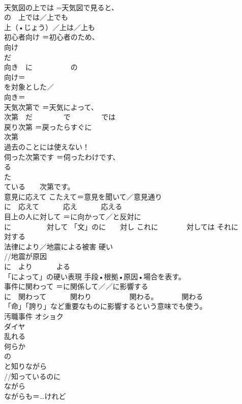 \documentclass[8pt]{extreport}
\begin{document}
\begin{CJK}{UTF8}{min}
\\	天気図の上では	=天気図で見ると、
\\	の　上では／上でも 
\\	上（•じょう）／上は／上も
\\	初心者向け	＝初心者のため、
\\	向け
\\	だ 
\\	向き　に　 　　　　の
\\	向け＝
\\	を対象とした／
\\	向き＝
\\	天気次第で	＝天気によって、
\\	次第　だ 　　　　で 　　　　では
\\	戻り次第	＝戻ったらすぐに 
\\	次第 
\\	過去のことには使えない！ 
\\	伺った次第です	＝伺ったわけです、
\\	る 
\\	た 
\\	ている　　次第です。
\\	意見に応えて	こたえて＝意見を聞いて／意見通り 
\\	に　応えて 　　　応え 　　　応える
\\	目上の人に対して	＝に向かって／と反対に 
\\	に　　　　　対して 「文」のに　　対し これに　　　　対しては それに　　　　対する
\\	法律により／地震による被害	硬い 
\\	//地震が原因 
\\	に　より 　　　よる
\\	「によって」の硬い表現 手段•根拠•原因•場合を表す。
\\	事件に関わって	＝に関係して／／に影響する 
\\	に　関わって 　　　関わり　　 　　　関わる。 　　　関わる
\\	「命」「誇り」など重要なものに影響するという意味でも使う。
\\	汚職事件	オショク 
\\	ダイヤ	
\\	乱れる	
\\	何らか
\\	の
\\	と知りながら	
\\	//知っているのに 
\\	ながら 
\\	ながらも＝…けれど 

\end{CJK}
\end{document}
